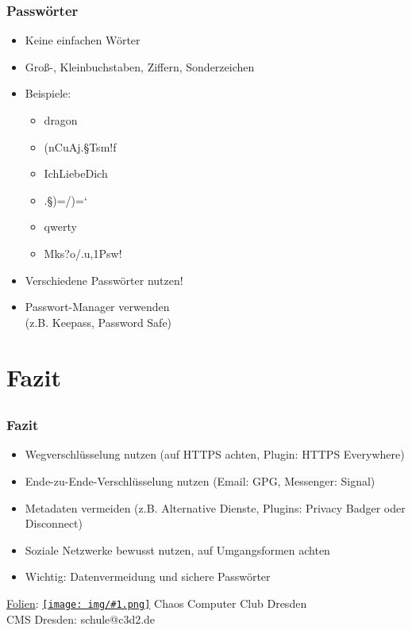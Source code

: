 \documentclass[12pt]{beamer}
\newcommand{\cc}[1]{\texttt{[image: img/\#1.png]}\hspace{1mm}}
\begin{document}
\begin{frame}
    \frametitle{Passwörter}
    \begin{itemize}
        \item<2-> Keine einfachen Wörter
        \item<3-> Groß-, Kleinbuchstaben, Ziffern, Sonderzeichen
        \item<4-> Beispiele:
            \begin{itemize}
                \item<5-> dragon
                \item<6-> (nCuAj.§Tsm!f
                \item<7-> IchLiebeDich
                \item<8-> .§)=/)=`
                \item<9-> qwerty
                \item<10-> Mks?o/.u,1Psw!
            \end{itemize}
        \item<12-> Verschiedene Passwörter nutzen!
        \item<13-> Passwort-Manager verwenden \\ (z.B. Keepass, Password Safe)
    \end{itemize}
\end{frame}

\section{Fazit}
\subsection{}

\begin{frame}
  \frametitle{Fazit}
  \begin{center}
    \begin{itemize}
      \item Wegverschlüsselung nutzen (auf HTTPS achten, Plugin: HTTPS Everywhere)
      \item Ende-zu-Ende-Verschlüsselung nutzen (Email: GPG, Messenger: Signal)
      \item Metadaten vermeiden (z.B. Alternative Dienste, Plugins: Privacy Badger oder Disconnect)
      \item Soziale Netzwerke bewusst nutzen, auf Umgangsformen achten
      \item Wichtig: Datenvermeidung und sichere Passwörter
    \end{itemize}

    \vspace{5mm}
    \href{https://github.com/cms/2016_05_04_kleinzschachwitz/}{Folien}: \href{https://creativecommons.org/licenses/by-sa/4.0/}{\cc{by-sa}} Chaos Computer Club Dresden \\
    \vspace{3mm}
    CMS Dresden: schule@c3d2.de
  \end{center}
\end{frame}
\end{document}
